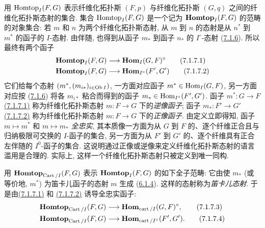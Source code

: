 用 $\operatorname{Homtop}_I(F,G)$ 表示纤维化拓扑斯 $(F,p)$
与纤维化拓扑斯 $(G,q)$ 之间的纤维化拓扑斯态射的集合.
集合 $\operatorname{Homtop}_I(F,G)$ 是一个记为 $\operatorname{\mathbf{Homtop}}_I(F,G)$ 的范畴的对象集合:
若 $m$ 和 $n$ 为两个纤维化拓扑斯态射,
从 $m$ 到 $n$ 的态射是从 $n^{\ast}$ 到 $m^{\ast}$ 的函子的 $I$-态射.
由伴随, 也得到从函子 $m_{\ast}$ 到函子 $n_{\ast}$ 的 $I^{\circ}$-态射
(\hyperref[VI.subsubsec7.1.6]{7.1.6}).
所以最终有两个函子
\hypertarget{sga4.exp.VI.equation.7.1.7.1}{}\begin{align*}
\Hhomtop_I (F, G) & \to \Hhom_I (G, F)^{\circ}\tag{7.1.7.1}\\
\Hhomtop_I (F, G) &\to \Hhom_{I^{\circ}} (F', G')\tag{7.1.7.2}
\end{align*}\hypertarget{sga4.exp.VI.equation.7.1.7.2}{}
它们给每个态射 $(m^{\ast},(m_{i\ast})_{i\in\operatorname{Ob} I})$,
一方面对应函子 $m^{\ast}\in\operatorname{Hom}_I(G,F)$,
另一方面对应按 (\hyperref[VI.subsubsec7.1.6]{7.1.6}) 将各 $m_{i\ast}$ 粘合而得到的函子
$m_{\ast}\in\operatorname{Hom}_{I^\circ}(F',G')$.
函子 $m^{\ast}:G\to F$ \hyperlink{sga4.exp.VI.equation.7.1.7.1}{(7.1.7.1)}
称为纤维化拓扑斯态射 $m:F\to G$ 下的\emph{逆像函子};
函子 $m_{\ast}:F'\to G'$ \hyperlink{sga4.exp.VI.equation.7.1.7.2}{(7.1.7.2)}
称为纤维化拓扑斯态射 $m:F\to G$ 下的\emph{正像函子}.
由定义立即得知, 函子 $m\mapsto m^{\ast}$ 和 $m\mapsto m_{\ast}$ \emph{全忠实},
其本质像一方面为从 $G$ 到 $F$ 的、逐个纤维正合且与归纳极限可交换的 $I$-函子的集合,
另一方面为从 $F'$ 到 $G'$ 的、逐个纤维具有正合左伴随的 $I^0$-函子的集合.
这说明通过正像或逆像来定义纤维化拓扑斯态射的语言滥用是合理的.
实际上, 这样一个纤维化\pageoriginale 拓扑斯态射只被定义到唯一同构.

用 $\operatorname{\mathbf{Homtop}}_{\operatorname{Cart}/I}(F,G)$ 表示 $\operatorname{\mathbf{Homtop}}_I(F,G)$ 的如下全子范畴:
它由使 $m_{\ast}$ (或等价地, $m^{\ast}$) 为笛卡儿函子的态射 $m$
生成 (\hyperref[VI.subsubsec6.1.4]{6.1.4}).
这样的态射称为\emph{笛卡儿态射}.
于是由\hyperlink{sga4.exp.VI.equation.7.1.7.1}{(7.1.7.1)} 和
\hyperlink{sga4.exp.VI.equation.7.1.7.2}{(7.1.7.2)} 诱导全忠实函子:
\hypertarget{sga4.exp.VI.equation.7.1.7.3}{}\begin{align*}
\Hhomtop_{\Cart/I} (F, G) & \to \Hhom_{\cart /I} (G,
  F)^{\circ}{\quoi},\tag{7.1.7.3}\\
\Hhomtop_{\Cart/I} (F, G) &\to \Hhom_{\cart /I^{\circ}} (F',
  G'){\quoi}.\tag{7.1.7.4}
\end{align*}\hypertarget{sga4.exp.VI.equation.7.1.7.4}{}

\subsubsection{}


